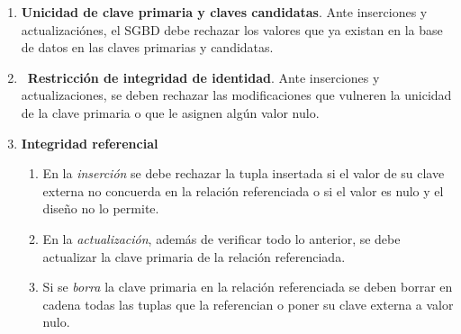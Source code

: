 \documentclass[12pt,spanish]{article}
\numberwithin{definition}{subsection}
\begin{document}
\begin{enumerate}
	\item \textbf{Unicidad de clave primaria y claves candidatas}. Ante inserciones y actualizaciónes, el SGBD debe rechazar los valores que ya existan en la base de datos en las claves primarias y candidatas.
	\item\ \textbf{Restricción de integridad de identidad}. Ante inserciones y actualizaciones, se deben rechazar las modificaciones que vulneren la unicidad de la clave primaria o que le asignen algún valor nulo.
	\item \textbf{Integridad referencial}
		\begin{enumerate}
			\item En la \emph{inserción} se debe rechazar la tupla insertada si el valor de su clave externa no concuerda en la relación referenciada o si el valor es nulo y el diseño no lo permite.
			\item En la \emph{actualización}, además de verificar todo lo anterior, se debe actualizar la clave primaria de la relación referenciada.
			\item Si se \emph{borra} la clave primaria en la relación referenciada se deben borrar en cadena todas las tuplas que la referencian o poner su clave externa a valor nulo.
		\end{enumerate}
\end{enumerate}
\end{document}
